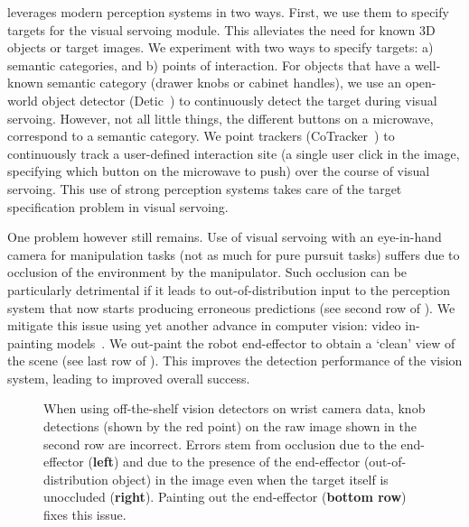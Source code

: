 \name leverages modern perception systems in two ways. First, we use them to
specify targets for the visual servoing module. This alleviates the need for
known 3D objects or target images. We experiment with two ways to specify
targets: a) semantic categories, and b) points of interaction. For objects that
have a well-known semantic category (\eg drawer knobs or cabinet handles), we
use an open-world object detector (\eg Detic~\cite{zhou2022detecting}) to
continuously detect the target during visual servoing. However, not all little
things, \eg the different buttons on a microwave, correspond to a semantic
category. We  point trackers (\eg CoTracker~\cite{karaev2023cotracker}) to continuously track a user-defined interaction site (\eg a single user click in the image, specifying which button on the microwave to push) over the course of visual servoing. This use of strong perception systems takes care of the target specification problem in visual servoing.

One problem however still remains. Use of visual servoing with an eye-in-hand
camera for manipulation tasks (not as much for pure pursuit tasks) suffers due
to occlusion of the environment by the manipulator. Such occlusion can be
particularly detrimental if it leads to out-of-distribution input to the
perception system that now starts producing erroneous predictions (see
second row of ). We mitigate this issue using yet another advance in
computer vision: video in-painting models~\cite{chang2023look,
zhou2023propainter, lee2019copy}. We out-paint the robot end-effector to obtain
a `clean' view of the scene (see last row of ). This improves the
detection performance of the vision system, leading to improved overall
success.

\begin{figure}
\setlength{\tabcolsep}{2pt}
\caption{When using off-the-shelf vision detectors on wrist camera data, knob detections (shown by the {\color{red} red point}) on the raw image shown in the second row are incorrect. Errors stem from occlusion due to the end-effector ({\bf left}) and due to the presence of the end-effector (out-of-distribution object) in the image even when the target itself is unoccluded ({\bf right}). Painting out the end-effector ({\bf bottom row}) fixes this issue.}
\end{figure}

